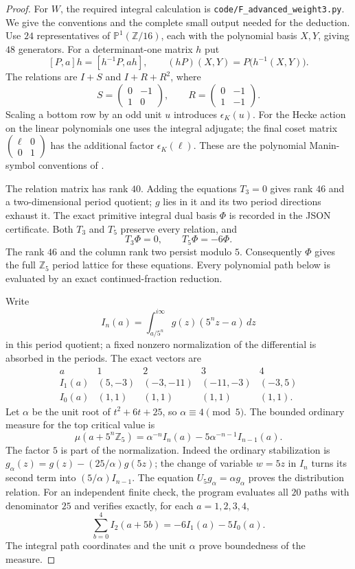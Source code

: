 \begin{proof}
For $W$, the required integral calculation is
\texttt{code/F\_advanced\_weight3.py}. We give the conventions
and the complete small output needed for the deduction.
Use $24$ representatives of $\mathbb P^1(\mathbb Z/16)$,
each with the polynomial basis $X,Y$, giving $48$ generators.
For a determinant-one matrix $h$ put
\[
 [P,a]h=[h^{-1}P,ah],\qquad
 (hP)(X,Y)=P\bigl(h^{-1}(X,Y)\bigr).
\]
The relations are $I+S$ and $I+R+R^2$, where
\[
 S=\begin{pmatrix}0&-1\\1&0\end{pmatrix},\qquad
 R=\begin{pmatrix}0&-1\\1&-1\end{pmatrix}.
\]
Scaling a bottom row by an odd unit $u$ introduces
$\epsilon_K(u)$. For the Hecke action on the linear polynomials
one uses the integral adjugate; the final coset matrix
$\left(\begin{smallmatrix}\ell&0\\0&1\end{smallmatrix}\right)$
has the additional factor $\epsilon_K(\ell)$.
These are the polynomial Manin-symbol conventions of
\citet[the general modular-symbol chapter]{FA_Stein2007}.

The relation matrix has rank $40$. Adding the equations $T_3=0$
gives rank $46$ and a two-dimensional period quotient; $g$ lies
in it and its two period directions exhaust it. The exact
primitive integral dual basis $\Phi$ is recorded in the JSON
certificate. Both $T_3$ and $T_5$ preserve every relation, and
\[
 T_3\Phi=0,\qquad T_5\Phi=-6\Phi.
\]
The rank $46$ and the column rank two persist modulo $5$.
Consequently $\Phi$ gives the full $\mathbb Z_5$ period lattice
for these equations. Every polynomial path below is evaluated
by an exact continued-fraction reduction.

Write
\[
 I_n(a)=\int_{a/5^n}^{i\infty}
              g(z)(5^nz-a)\,dz
\]
in this period quotient; a fixed nonzero normalization of the
differential is absorbed in the periods. The exact vectors are
\[
 \begin{array}{c|rrrr}
 a&1&2&3&4\\\hline
 I_1(a)&(5,-3)&(-3,-11)&(-11,-3)&(-3,5)\\
 I_0(a)&(1,1)&(1,1)&(1,1)&(1,1).
 \end{array}
\]
Let $\alpha$ be the unit root of $t^2+6t+25$, so
$\alpha\equiv4\pmod5$. The bounded ordinary measure for the
top critical value is
\[
 \mu(a+5^n\mathbb Z_5)
   =\alpha^{-n}I_n(a)-5\alpha^{-n-1}I_{n-1}(a).
\]
The factor $5$ is part of the normalization. Indeed the ordinary
stabilization is $g_\alpha(z)=g(z)-(25/\alpha)g(5z)$;
the change of variable $w=5z$ in $I_n$ turns its second term
into $(5/\alpha)I_{n-1}$. The equation
$U_5g_\alpha=\alpha g_\alpha$ proves the distribution relation.
For an independent finite check, the program evaluates all
$20$ paths with denominator $25$ and verifies exactly, for each
$a=1,2,3,4$,
\[
 \sum_{b=0}^4I_2(a+5b)=-6I_1(a)-5I_0(a).
\]
The integral path coordinates and the unit $\alpha$ prove
boundedness of the measure.


\end{proof}
